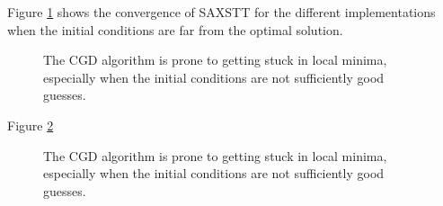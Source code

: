 Figure \ref{fig:Loss_curve_worst} shows the convergence of SAXSTT for the different implementations when the initial conditions are far from the optimal solution.

\begin{figure}[h!]
    \centering
    \caption{ The CGD algorithm is prone to getting stuck in local minima, especially when the initial conditions are not sufficiently good guesses.  }
    \label{fig:Loss_curve_worst}
\end{figure}

Figure \ref{fig:Loss_curve_carbon}

\begin{figure}[h!]
    \centering
    \caption{ The CGD algorithm is prone to getting stuck in local minima, especially when the initial conditions are not sufficiently good guesses.  }
    \label{fig:Loss_curve_carbon}
\end{figure}